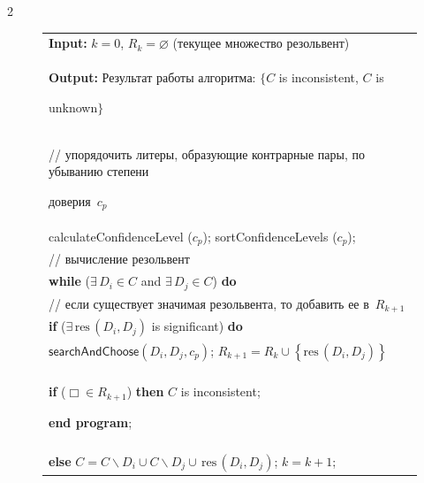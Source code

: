 \begin{multicols}{2}
\begin{figure}[b]
\begin{center}
{\begin{tabular}{|p{118mm}|}
   \textbf{Input:} $k=0$, $R_k=\varnothing$ (текущее множество резольвент)\\


   \textbf{Output:} Результат работы алгоритма: $\{$$C$ is inconsistent, $C$ is 


unknown$\}$\\


{\footnotesize // упорядочить литеры, образующие контрарные пары, по убыванию степени 


доверия~$c_p$}\\


  {\sf calculateConfidenceLevel} ($c_p$); {\sf sortConfidenceLevels} ($c_p$);\\


  {\footnotesize // вычисление резольвент}\\


  \textbf{while} ($\exists\,D_i\in C$ and $\exists\,D_j\in C$) \textbf{do}\\


  {\footnotesize // если существует значимая резольвента, то добавить ее в~$R_{k+1}$}\\


        \hspace*{5mm}\textbf{if} ($\exists\,\mathrm{res}\,(D_i, D_j)$ is significant) \textbf{do}\\


        \hspace*{5mm}$\mathsf{searchAndChoose} (D_i, D_j, c_p)$; $R_{k+1}=R_k\cup 


\left\{ \mathrm{res}\,(D_i, D_j)\right\}$\\


        \hspace*{5mm}{\footnotesize // проверка: существует ли в~$R_{k+1}$ пустой 


дизъюнкт~$\Box$}\\


        \hspace*{5mm}\textbf{if} ($\Box\in R_{k+1}$) \textbf{then} $C$ is inconsistent;  


\textbf{end program};\\


        \hspace*{5mm}{\footnotesize // если в~$R_{k+1}$ нет $\Box$, то изменить множество~$C$}\\


        \hspace*{5mm}\textbf{else} $C=C\backslash D_i\cup C\backslash D_j \cup\,\mathrm{res}\,(D_i,D_j)$; $k=k+1$;\\



\end{tabular}}
\end{center}
\end{figure}
\end{multicols}
